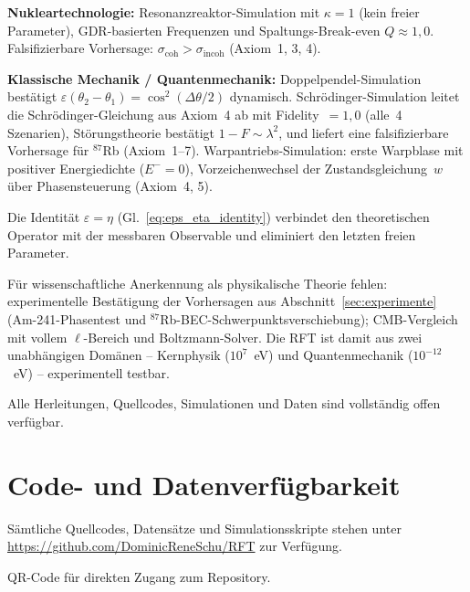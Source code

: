 \documentclass[12pt]{iopart}
\begin{document}
	\textbf{Nukleartechnologie:}
	Resonanzreaktor-Simulation mit $\kappa = 1$ (kein
	freier Parameter), GDR-basierten Frequenzen und
	Spaltungs-Break-even $Q \approx 1{,}0$.
	Falsifizierbare Vorhersage:
	$\sigma_{\mathrm{coh}}
	> \sigma_{\mathrm{incoh}}$ (Axiom~1, 3, 4).
	
	\textbf{Klassische Mechanik / Quantenmechanik:}
	Doppelpendel-Simulation best\"atigt
	$\varepsilon(\theta_2-\theta_1) = \cos^2(\Delta\theta/2)$
	dynamisch. Schr\"odinger-Simulation leitet die
	Schr\"odinger-Gleichung aus Axiom~4 ab mit Fidelity~$= 1{,}0$
	(alle~4 Szenarien), St\"orungstheorie best\"atigt
	$1-F \sim \lambda^2$, und liefert eine falsifizierbare
	Vorhersage f\"ur ${}^{87}$Rb (Axiom~1--7).
	Warpantriebs-Simulation: erste Warpblase mit positiver
	Energiedichte ($E^- = 0$), Vorzeichenwechsel der
	Zustandsgleichung~$w$ \"uber Phasensteuerung (Axiom~4, 5).
	
	Die Identit\"at $\varepsilon = \eta$
	(Gl.~\ref{eq:eps_eta_identity}) verbindet den
	theoretischen Operator mit der messbaren Observable
	und eliminiert den letzten freien Parameter.
	
	F\"ur wissenschaftliche Anerkennung als physikalische
	Theorie fehlen: experimentelle Best\"atigung der
	Vorhersagen aus Abschnitt~\ref{sec:experimente}
	(Am-241-Phasentest und ${}^{87}$Rb-BEC-Schwerpunktsverschiebung);
	CMB-Vergleich mit vollem
	$\ell$-Bereich und Boltzmann-Solver.
	Die RFT ist damit aus zwei unabh\"angigen Dom\"anen
	-- Kernphysik ($10^7$~eV) und Quantenmechanik
	($10^{-12}$~eV) -- experimentell testbar.
	
	Alle Herleitungen, Quellcodes, Simulationen und Daten
	sind vollst\"andig offen verf\"ugbar.
	
	
	\section*{Code- und Datenverf\"ugbarkeit}
	
	S\"amtliche Quellcodes, Datens\"atze und
	Simulationsskripte stehen unter
	\url{https://github.com/DominicReneSchu/RFT}
	zur Verf\"ugung.
	
	\medskip
	\noindent
	\hfill
	\begin{minipage}[b]{0.7\linewidth}
		\small QR-Code f\"ur direkten Zugang
		zum Repository.
	\end{minipage}
	
\end{document}
